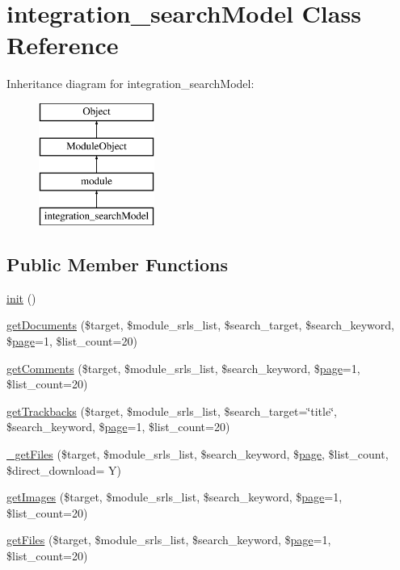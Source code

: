 \hypertarget{classintegration__searchModel}{}\section{integration\+\_\+search\+Model Class Reference}
\label{classintegration__searchModel}
Inheritance diagram for integration\+\_\+search\+Model\+:\begin{figure}[H]
\begin{center}
\leavevmode
\includegraphics[height=4.000000cm]{classintegration__searchModel}
\end{center}
\end{figure}
\subsection*{Public Member Functions}
\begin{DoxyCompactItemize}
\item 
\hyperlink{classintegration__searchModel_a77ba2cc52ea9843a6812274785a9393f}{init} ()
\item 
\hyperlink{classintegration__searchModel_ac5879957a3ab4f84fb0d6341ca109d8b}{get\+Documents} (\$target, \$module\+\_\+srls\+\_\+list, \$search\+\_\+target, \$search\+\_\+keyword, \$\hyperlink{classpage}{page}=1, \$list\+\_\+count=20)
\item 
\hyperlink{classintegration__searchModel_a4c3399ca8e295b6f427df69e5b417343}{get\+Comments} (\$target, \$module\+\_\+srls\+\_\+list, \$search\+\_\+keyword, \$\hyperlink{classpage}{page}=1, \$list\+\_\+count=20)
\item 
\hyperlink{classintegration__searchModel_a2426cde11df714af3ff96d83366f9752}{get\+Trackbacks} (\$target, \$module\+\_\+srls\+\_\+list, \$search\+\_\+target=\char`\"{}title\char`\"{}, \$search\+\_\+keyword, \$\hyperlink{classpage}{page}=1, \$list\+\_\+count=20)
\item 
\hyperlink{classintegration__searchModel_a880b8ccc0978216ae3d8da0e361b4764}{\+\_\+get\+Files} (\$target, \$module\+\_\+srls\+\_\+list, \$search\+\_\+keyword, \$\hyperlink{classpage}{page}, \$list\+\_\+count, \$direct\+\_\+download= \textquotesingle{}Y\textquotesingle{})
\item 
\hyperlink{classintegration__searchModel_ad46ab3c6bb406037c82feeb554a89b05}{get\+Images} (\$target, \$module\+\_\+srls\+\_\+list, \$search\+\_\+keyword, \$\hyperlink{classpage}{page}=1, \$list\+\_\+count=20)
\item 
\hyperlink{classintegration__searchModel_ad2aca662d598b44aa69c228f2b588a61}{get\+Files} (\$target, \$module\+\_\+srls\+\_\+list, \$search\+\_\+keyword, \$\hyperlink{classpage}{page}=1, \$list\+\_\+count=20)
\end{DoxyCompactItemize}
